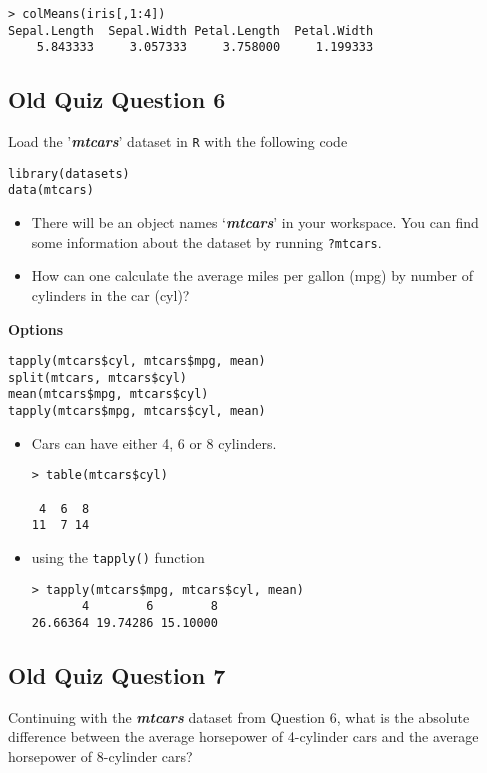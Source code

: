 \documentclass[]{article}
\begin{document}
\begin{verbatim}
> colMeans(iris[,1:4])
Sepal.Length  Sepal.Width Petal.Length  Petal.Width 
    5.843333     3.057333     3.758000     1.199333
\end{verbatim}


\newpage
\subsection*{Old Quiz Question 6}
Load the '\textit{\textbf{mtcars}}' dataset in \texttt{R} with the following code

\begin{framed}
\begin{verbatim}
library(datasets)
data(mtcars)
\end{verbatim}
\end{framed}

\begin{itemize}
\item There will be an object names `\textit{\textbf{mtcars}}' in your workspace. You can find some information about the dataset by running
\texttt{?mtcars}.

\item How can one calculate the average miles per gallon (mpg) by number of cylinders in the car (cyl)?
\end{itemize}
\textbf{Options}
\begin{verbatim}
tapply(mtcars$cyl, mtcars$mpg, mean)
split(mtcars, mtcars$cyl)
mean(mtcars$mpg, mtcars$cyl)
tapply(mtcars$mpg, mtcars$cyl, mean)
\end{verbatim}

\begin{itemize}
\item Cars can have either 4, 6 or 8 cylinders.
\begin{verbatim}
> table(mtcars$cyl)

 4  6  8 
11  7 14 
\end{verbatim}
\item using the \texttt{tapply()} function
\begin{verbatim}
> tapply(mtcars$mpg, mtcars$cyl, mean)
       4        6        8 
26.66364 19.74286 15.10000
\end{verbatim}
\end{itemize}
\newpage
\subsection*{Old Quiz Question 7}
Continuing with the \textit{\textbf{mtcars}} dataset from Question 6, what is the absolute difference between the average horsepower of 4-cylinder cars and the average horsepower of 8-cylinder cars?
\end{document}
